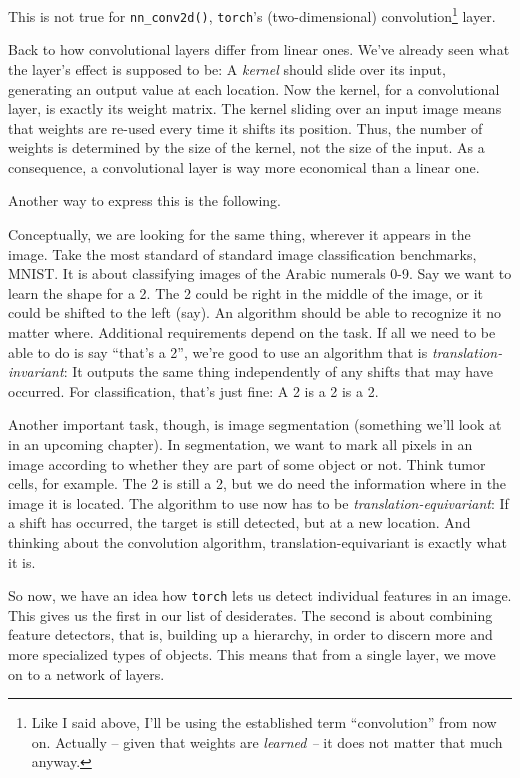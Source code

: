 \documentclass[
  letterpaper,
]{krantz}
\begin{document}
This is not true for \texttt{nn\_conv2d()}, \texttt{torch}'s
(two-dimensional) convolution\footnote{Like I said above, I'll be using
  the established term ``convolution'' from now on. Actually -- given
  that weights are \emph{learned --} it does not matter that much
  anyway.} layer.

Back to how convolutional layers differ from linear ones. We've already
seen what the layer's effect is supposed to be: A \emph{kernel} should
slide over its input, generating an output value at each location. Now
the kernel, for a convolutional layer, is exactly its weight matrix. The
kernel sliding over an input image means that weights are re-used every
time it shifts its position. Thus, the number of weights is determined
by the size of the kernel, not the size of the input. As a consequence,
a convolutional layer is way more economical than a linear one.

Another way to express this is the following.

Conceptually, we are looking for the same thing, wherever it appears in
the image. Take the most standard of standard image classification
benchmarks, MNIST. It is about classifying images of the Arabic numerals
0-9. Say we want to learn the shape for a 2. The 2 could be right in the
middle of the image, or it could be shifted to the left (say). An
algorithm should be able to recognize it no matter where. Additional
requirements depend on the task. If all we need to be able to do is say
``that's a 2'', we're good to use an algorithm that is
\emph{translation-invariant}: It
outputs the same thing independently of any shifts that may have
occurred. For classification, that's just fine: A 2 is a 2 is a 2.

Another important task, though, is image segmentation (something we'll
look at in an upcoming chapter). In segmentation, we want to mark all
pixels in an image according to whether they are part of some object or
not. Think tumor cells, for example. The 2 is still a 2, but we do need
the information where in the image it is located. The algorithm to use
now has to be
\emph{translation-equivariant}: If a
shift has occurred, the target is still detected, but at a new location.
And thinking about the convolution algorithm, translation-equivariant is
exactly what it is.

So now, we have an idea how \texttt{torch} lets us detect individual
features in an image. This gives us the first in our list of
desiderates. The second is about combining feature detectors, that is,
building up a hierarchy, in order to discern more and more specialized
types of objects. This means that from a single layer, we move on to a
network of layers.
\end{document}
